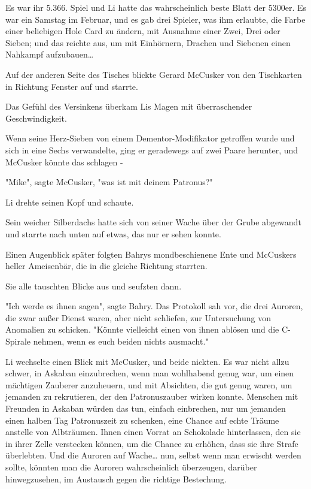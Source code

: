 {Es war ihr 5.366. Spiel und Li hatte das wahrscheinlich beste Blatt der 5300er. Es war ein Samstag im Februar, und es gab drei Spieler, was ihm erlaubte, die Farbe einer beliebigen Hole Card zu ändern, mit Ausnahme einer Zwei, Drei oder Sieben; und das reichte aus, um mit Einhörnern, Drachen und Siebenen einen Nahkampf aufzubauen…

Auf der anderen Seite des Tisches blickte Gerard McCusker von den Tischkarten in Richtung Fenster auf und starrte.

Das Gefühl des Versinkens überkam Lis Magen mit überraschender Geschwindigkeit.

Wenn seine Herz-Sieben von einem Dementor-Modifikator getroffen wurde und sich in eine Sechs verwandelte, ging er geradewegs auf zwei Paare herunter, und McCusker könnte das schlagen -

"Mike", sagte McCusker, "was ist mit deinem Patronus?"

Li drehte seinen Kopf und schaute.

Sein weicher Silberdachs hatte sich von seiner Wache über der Grube abgewandt und starrte nach unten auf etwas, das nur er sehen konnte.

Einen Augenblick später folgten Bahrys mondbeschienene Ente und McCuskers heller Ameisenbär, die in die gleiche Richtung starrten.

Sie alle tauschten Blicke aus und seufzten dann.

"Ich werde es ihnen sagen", sagte Bahry. Das Protokoll sah vor, die drei Auroren, die zwar außer Dienst waren, aber nicht schliefen, zur Untersuchung von Anomalien zu schicken. "Könnte vielleicht einen von ihnen ablösen und die C-Spirale nehmen, wenn es euch beiden nichts ausmacht."

Li wechselte einen Blick mit McCusker, und beide nickten. Es war nicht allzu schwer, in Askaban einzubrechen, wenn man wohlhabend genug war, um einen mächtigen Zauberer anzuheuern, und mit Absichten, die gut genug waren, um jemanden zu rekrutieren, der den Patronuszauber wirken konnte. Menschen mit Freunden in Askaban würden das tun, einfach einbrechen, nur um jemanden einen halben Tag Patronuszeit zu schenken, eine Chance auf echte Träume anstelle von Albträumen. Ihnen einen Vorrat an Schokolade hinterlassen, den sie in ihrer Zelle verstecken können, um die Chance zu erhöhen, dass sie ihre Strafe überlebten. Und die Auroren auf Wache… nun, selbst wenn man erwischt werden sollte, könnten man die Auroren wahrscheinlich überzeugen, darüber hinwegzusehen, im Austausch gegen die richtige Bestechung.

}

